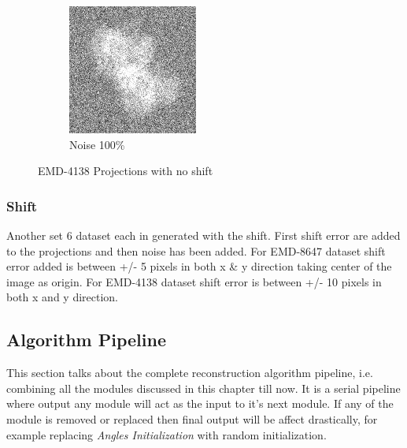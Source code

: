 \documentclass{report}
\begin{document}
\begin{figure}[h]
\begin{subfigure}{.28\textwidth}
\includegraphics[width=0.8\linewidth]{Emd_4138_proj1_noise_100.jpg}
\captionsetup{justification=centering}
\caption{ Noise 100\%}
\end{subfigure}
\caption{EMD-4138 Projections with no shift}
\label{fig:EMD-8647 Projections: Noisy}
\end{figure}

\subsubsection{Shift}

Another set 6 dataset each in generated with the shift. First shift error are added to the projections and then noise has been added. For EMD-8647 dataset shift error added is between +/- 5 pixels in both x \& y direction taking center of the image as origin. For EMD-4138 dataset shift error is between +/-  10 pixels in both x and y direction.

\subsection{Algorithm Pipeline}

This section talks about the complete reconstruction algorithm pipeline, i.e. combining all the modules discussed in this chapter till now. It is a serial pipeline where output any module will act as the input to it's next module. If any of the module is removed or replaced then final output will be affect drastically, for example replacing \textit{Angles Initialization} with random initialization.  
\end{document}
